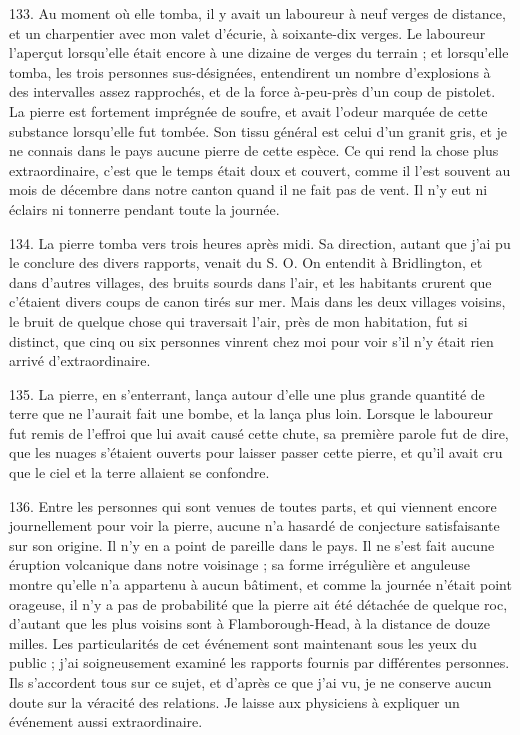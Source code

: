 \documentclass[a4paper, 11pt, oneside, polutonikogreek, french]{article}
\begin{document}
133. Au moment où elle tomba, il y avait un laboureur à neuf verges de distance, et un charpentier avec mon valet d'écurie, à soixante-dix verges. Le laboureur l'aperçut lorsqu'elle était encore à une dizaine de verges du terrain ; et lorsqu'elle tomba, les trois personnes sus-désignées, entendirent un nombre d'explosions à des intervalles assez rapprochés, et de la force à-peu-près d'un coup de pistolet. La pierre est fortement imprégnée de soufre, et avait l'odeur marquée de cette substance lorsqu'elle fut tombée. Son tissu général est celui d'un granit gris, et je ne connais dans le pays aucune pierre de cette espèce. Ce qui rend la chose plus extraordinaire, c'est que le temps était doux et couvert, comme il l'est souvent au mois de décembre dans notre canton quand il ne fait pas de vent. Il n'y eut ni éclairs ni tonnerre pendant toute la journée.

134. La pierre tomba vers trois heures après midi. Sa direction, autant que j'ai pu le conclure des divers rapports, venait du S. O. On entendit à Bridlington, et dans d'autres villages, des bruits sourds dans l'air, et les habitants crurent que c'étaient divers coups de canon tirés sur mer. Mais dans les deux villages voisins, le bruit de quelque chose qui traversait l'air, près de mon habitation, fut si distinct, que cinq ou six personnes vinrent chez moi pour voir s'il n'y était rien arrivé d'extraordinaire.

135. La pierre, en s'enterrant, lança autour d'elle une plus grande quantité de terre que ne l'aurait fait une bombe, et la lança plus loin. Lorsque le laboureur fut remis de l'effroi que lui avait causé cette chute, sa première parole fut de dire, \og que les nuages s'étaient ouverts pour laisser passer cette pierre, et qu'il avait cru que le ciel et la terre allaient se confondre. \fg

136. Entre les personnes qui sont venues de toutes parts, et qui viennent encore journellement pour voir la pierre, aucune n'a hasardé de conjecture satisfaisante sur son origine. Il n'y en a point de pareille dans le pays. Il ne s'est fait aucune éruption volcanique dans notre voisinage ; sa forme irrégulière et anguleuse montre qu'elle n'a appartenu à aucun bâtiment, et comme la journée n'était point orageuse, il n'y a pas de probabilité que la pierre ait été détachée de quelque roc, d'autant que les plus voisins sont à Flamborough-Head, à la distance de douze milles. Les particularités de cet événement sont maintenant sous les yeux du public ; j'ai soigneusement examiné les rapports fournis par différentes personnes. Ils s'accordent tous sur ce sujet, et d'après ce que j'ai vu, je ne conserve aucun doute sur la véracité des relations. Je laisse aux physiciens à expliquer un événement aussi extraordinaire.
\end{document}
